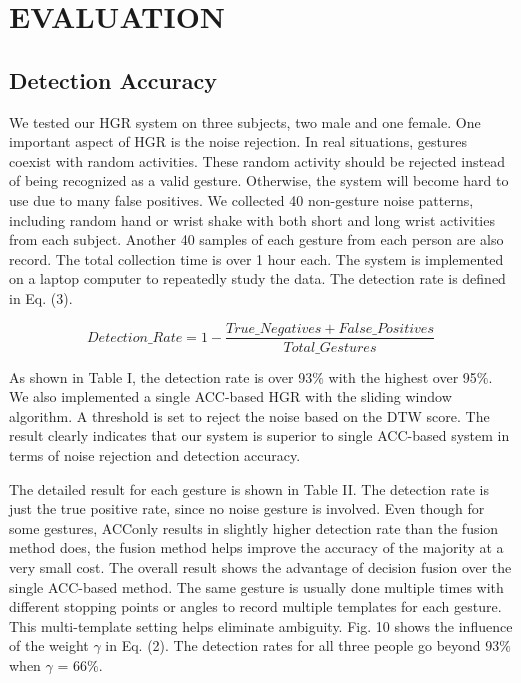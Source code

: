 \section{EVALUATION}
\subsection{Detection Accuracy}
We tested our HGR system on three subjects, two male
and one female. One important aspect of HGR is the noise
rejection. In real situations, gestures coexist with random
activities. These random activity should be rejected instead of
being recognized as a valid gesture. Otherwise, the system will
become hard to use due to many false positives. We collected
40 non-gesture noise patterns, including random hand or wrist
shake with both short and long wrist activities from each
subject. Another 40 samples of each gesture from each person
are also record. The total collection time is over 1 hour each.
The system is implemented on a laptop computer to repeatedly
study the data. The detection rate is defined in Eq. (3).

\begin{footnotesize}
\begin{equation}
Detection\_Rate = 1-\frac{True\_Negatives+False\_Positives}{Total\_Gestures}
\end{equation}
\end{footnotesize}

As shown in Table I, the detection rate is over 93$\%$ with the
highest over 95$\%$. We also implemented a single ACC-based
HGR with the sliding window algorithm. A threshold is set to
reject the noise based on the DTW score. The result clearly
indicates that our system is superior to single ACC-based
system in terms of noise rejection and detection accuracy.

The detailed result for each gesture is shown in Table II.
The detection rate is just the true positive rate, since no noise
gesture is involved. Even though for some gestures, ACConly
results in slightly higher detection rate than the fusion
method does, the fusion method helps improve the accuracy
of the majority at a very small cost. The overall result shows
the advantage of decision fusion over the single ACC-based
method. The same gesture is usually done multiple times with
different stopping points or angles to record multiple templates
for each gesture. This multi-template setting helps eliminate
ambiguity. Fig. 10 shows the influence of the weight $\gamma$ in
Eq. (2). The detection rates for all three people go beyond
93$\%$ when $\gamma$ = 66$\%$.

